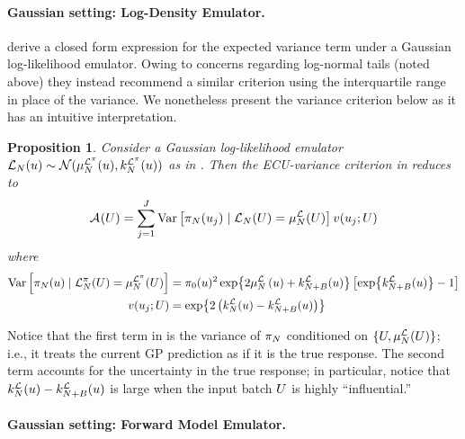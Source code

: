 \documentclass[12pt]{article}
\newtheorem{prop}{Proposition}
\begin{document}
\paragraph{Gaussian setting: Log-Density Emulator.} 

\citet{VehtariParallelGP} derive a closed form expression for the expected variance term under a Gaussian
log-likelihood emulator. Owing to concerns regarding log-normal tails (noted above) they instead recommend
a similar criterion using the interquartile range in place of the variance. We nonetheless present the variance 
criterion below as it has an intuitive interpretation.

\begin{prop} \label{prop:acq-intvar-ldens-Gaussian}
Consider a Gaussian log-likelihood emulator 
$\llikEm[\Ndesign](\Par) \sim \Gaussian(\emMean[\Ndesign]{\lpost}(\Par), \emKer[\Ndesign]{\lpost}(\Par))$
as in . Then the ECU-variance criterion in  reduces to
\begin{equation}
\acq[](\parMat) = 
\sum_{j=1}^{J} \Var\left[\postEm(\Par_j) \given \llikEm(\parMat) = \emMean[\Ndesign]{\llik}(\parMat) \right] \varInflation(\Par_j; \parMat)   
\label{eq:acq-intvar-saa-ldens}
\end{equation}
where
\begin{align*}
\Var\left[\postEm(\Par) \given \lpostEm(\parMat) = \emMean[\Ndesign]{\lpost}(\parMat) \right]
&= \priorDens(\Par)^2 \Exp{2\emMean[\Ndesign]{\llik}\left(\Par\right) + \emKer[\Naugment]{\llik}(\Par)} 
\left[\Exp{\emKer[\Naugment]{\llik}(\Par)} - 1 \right] \\
\varInflation(\Par_j; \parMat)
&= \Exp{2\left(\emKer[\Ndesign]{\llik}(\Par) - \emKer[\Naugment]{\llik}(\Par)\right)}
\end{align*}
\end{prop}

Notice that the first term in  is the variance of $\postEm[\Ndesign]$ conditioned on
$\{\parMat, \emMean[\Ndesign]{\llik}(\parMat)\}$; i.e., it treats the current GP prediction as if it is the true response.
The second term accounts for the uncertainty in the true response; in particular, notice that 
$\emKer[\Ndesign]{\llik}(\Par) - \emKer[\Naugment]{\llik}(\Par)$ is large when the input batch $\parMat$ is highly 
``influential.''

\paragraph{Gaussian setting: Forward Model Emulator.}
\end{document}
